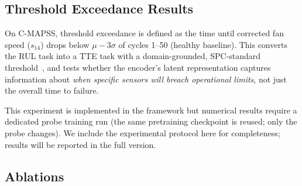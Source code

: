 \documentclass{article}
\begin{document}
\subsection{Threshold Exceedance Results}
\label{sec:tte_results}

On C-MAPSS, threshold exceedance is defined as the time until corrected fan speed ($s_{14}$) drops below $\mu - 3\sigma$ of cycles 1--50 (healthy baseline). This converts the RUL task into a TTE task with a domain-grounded, SPC-standard threshold~\citep{montgomery2020spc}, and tests whether the encoder's latent representation captures information about \emph{when specific sensors will breach operational limits}, not just the overall time to failure.

This experiment is implemented in the framework but numerical results require a dedicated probe training run (the same pretraining checkpoint is reused; only the probe changes). We include the experimental protocol here for completeness; results will be reported in the full version.

\subsection{Ablations}
\label{sec:ablations}
\end{document}
